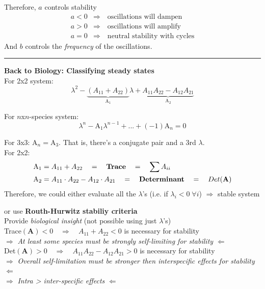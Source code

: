 \documentclass{article}
\newcommand{\ind}{\-\hspace{1cm}}
\begin{document}
Therefore, $a$ controls stability
\begin{align*}
	a<0 &\Rightarrow \quad \text{oscillations will dampen}\\
	a>0 &\Rightarrow \quad \text{oscillations will amplify}\\
	a=0 &\Rightarrow \quad \text{neutral stability with cycles}
\end{align*}
And $b$ controls the \emph{frequency} of the oscillations.

\rule[0.5ex]{\linewidth}{1pt}

\textbf{Back to Biology:  Classifying steady states}\\
For 2x2 system:
\begin{equation*}
	\lambda^2 - \underbrace{(A_{11}+A_{22})}_{\text{A}_1}\lambda + \underbrace{A_{11}A_{22} - A_{12}A_{21}}_{\text{A}_2}
\end{equation*}

For $n$x$n$-species system:
\begin{equation*}
	\lambda^n - \text{A}_1 \lambda^{n-1} + ... + (-1)\text{A}_n = 0
\end{equation*}

For 3x3: $\text{A}_n = \text{A}_3$.  That is, there's a conjugate pair and a 3rd $\lambda$.\\

For 2x2:
\begin{align*}
&\text{A}_1 = A_{11}+A_{22} \quad = \quad \text{\textbf{Trace}} \quad = \quad \sum A_{ii}\\
&\text{A}_2 = A_{11}\cdot A_{22} - A_{12}\cdot A_{21} \quad = \quad \text{\textbf{Determinant}} \quad = \quad Det(\mathbf{A})
\end{align*}
Therefore, we could either evaluate all the $\lambda$'s (i.e. if $\lambda_i < 0 \; \forall i$) $\Rightarrow$ stable system


or use \textbf{Routh-Hurwitz stabiliy criteria}\\
\ind \ind Provide \emph{biological insight} (not possible using just $\lambda$'s)\\

\ind Trace$(\mathbf{A})<0 \quad \Rightarrow \quad A_{11}+A_{22}<0$ is necessary for stability\\
\ind \ind $\Rightarrow$ \emph{At least some species must be strongly self-limiting for stability} $\Leftarrow$ \\

\ind Det$(\mathbf{A})>0  \quad \Rightarrow \quad A_{11} A_{22} - A_{12} A_{21} > 0$ is necessary for stability\\
\ind \ind $\Rightarrow$ \emph{Overall self-limitation must be stronger then interspecific effects for stability} $\Leftarrow$\\
\ind \ind $\Rightarrow$ \emph{Intra > inter-specific effects} $\Leftarrow$ \\
\end{document}
